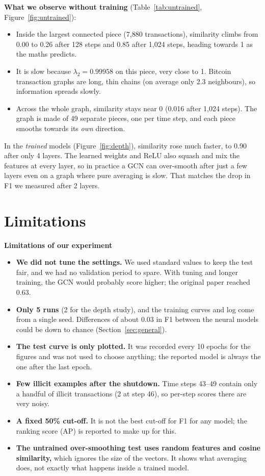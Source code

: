 \documentclass[11pt,a4paper]{article}
\begin{document}
\textbf{What we observe without training} (Table~\ref{tab:untrained}, Figure~\ref{fig:untrained}):
\begin{itemize}
  \item Inside the largest connected piece (7,880 transactions), similarity climbs from 0.00 to 0.26 after 128 steps and
        0.85 after 1,024 steps, heading towards 1 as the maths predicts.
  \item It is slow because $\lambda_2 = 0.99958$ on this piece, very close to 1. Bitcoin transaction graphs are long, thin chains
        (on average only 2.3 neighbours), so information spreads slowly.
  \item Across the whole graph, similarity stays near 0 (0.016 after 1,024 steps). The graph is made of 49 separate pieces, one
        per time step, and each piece smooths towards its \emph{own} direction.
\end{itemize}
In the \emph{trained} models (Figure~\ref{fig:depth}), similarity rose much faster, to 0.90 after only 4 layers. The learned
weights and ReLU also squash and mix the features at every layer, so in practice a GCN can over-smooth after just a few layers
even on a graph where pure averaging is slow. That matches the drop in F1 we measured after 2 layers.

\section{Limitations}
\textbf{Limitations of our experiment}
\begin{itemize}
  \item \textbf{We did not tune the settings.} We used standard values to keep the test fair, and we had no validation period
        to spare. With tuning and longer training, the GCN would probably score higher; the original paper reached 0.63.
  \item \textbf{Only 5 runs} (2 for the depth study), and the training curves and log come from a single seed. Differences of
        about 0.03 in F1 between the neural models could be down to chance (Section~\ref{sec:general}).
  \item \textbf{The test curve is only plotted.} It was recorded every 10 epochs for the figures and was not used to choose
        anything; the reported model is always the one after the last epoch.
  \item \textbf{Few illicit examples after the shutdown.} Time steps 43--49 contain only a handful of illicit transactions
        (2 at step 46), so per-step scores there are very noisy.
  \item \textbf{A fixed 50\% cut-off.} It is not the best cut-off for F1 for any model; the ranking score (AP) is reported to make
        up for this.
  \item \textbf{The untrained over-smoothing test uses random features and cosine similarity,} which ignores the size of the
        vectors. It shows what averaging does, not exactly what happens inside a trained model.
\end{itemize}
\end{document}
